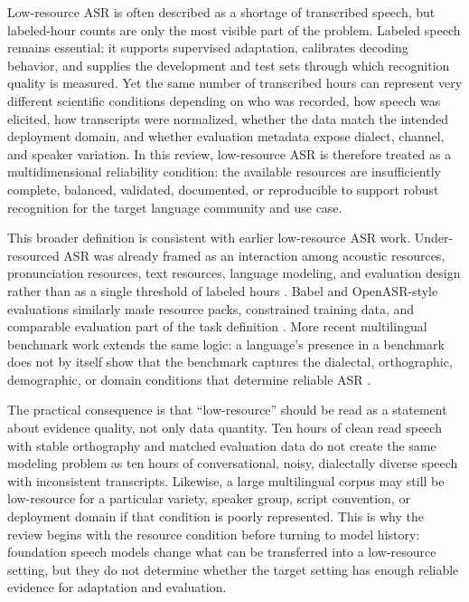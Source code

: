 \documentclass[pdflatex,sn-basic]{sn-jnl}
\theoremstyle{thmstyleone}
\theoremstyle{thmstyletwo}
\theoremstyle{thmstylethree}
\begin{document}
Low-resource ASR is often described as a shortage of transcribed speech, but labeled-hour counts are only the most visible part of the problem. Labeled speech remains essential: it supports supervised adaptation, calibrates decoding behavior, and supplies the development and test sets through which recognition quality is measured. Yet the same number of transcribed hours can represent very different scientific conditions depending on who was recorded, how speech was elicited, how transcripts were normalized, whether the data match the intended deployment domain, and whether evaluation metadata expose dialect, channel, and speaker variation. In this review, low-resource ASR is therefore treated as a multidimensional reliability condition: the available resources are insufficiently complete, balanced, validated, documented, or reproducible to support robust recognition for the target language community and use case.

This broader definition is consistent with earlier low-resource ASR work. Under-resourced ASR was already framed as an interaction among acoustic resources, pronunciation resources, text resources, language modeling, and evaluation design rather than as a single threshold of labeled hours \citep{besacier2014_underresourced_asr_survey}. Babel and OpenASR-style evaluations similarly made resource packs, constrained training data, and comparable evaluation part of the task definition \citep{gales2014_babel_project_research_cued,peterson2022_openasr21}. More recent multilingual benchmark work extends the same logic: a language's presence in a benchmark does not by itself show that the benchmark captures the dialectal, orthographic, demographic, or domain conditions that determine reliable ASR \citep{chen2025mlsuperb2challenge}.

The practical consequence is that ``low-resource'' should be read as a statement about evidence quality, not only data quantity. Ten hours of clean read speech with stable orthography and matched evaluation data do not create the same modeling problem as ten hours of conversational, noisy, dialectally diverse speech with inconsistent transcripts. Likewise, a large multilingual corpus may still be low-resource for a particular variety, speaker group, script convention, or deployment domain if that condition is poorly represented. This is why the review begins with the resource condition before turning to model history: foundation speech models change what can be transferred into a low-resource setting, but they do not determine whether the target setting has enough reliable evidence for adaptation and evaluation.
\end{document}
